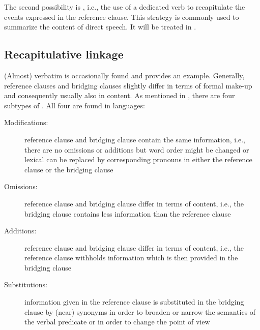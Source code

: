 \documentclass[output=paper]{LSP/langsci}
\begin{document}
The second possibility is , i.e., the use of a dedicated verb to recapitulate the events expressed in the reference clause. This strategy is commonly used to summarize the content of direct speech. It will be treated in .



\subsection{Recapitulative linkage}
\label{ssec:Recapitulative linkage}
(Almost) verbatim  is occasionally found and  provides an example. Generally, reference clauses and bridging clauses slightly differ in terms of formal make-up and consequently usually also in content. As mentioned in , there are four subtypes of . All four are found in  languages:

\begin{description}  
\item[Modifications:] reference clause and bridging clause contain the same information, i.e., there are no omissions or additions but word order might be changed or lexical  can be replaced by corresponding pronouns in either the reference clause or the bridging clause
\item[Omissions:] reference clause and bridging clause differ in terms of content, i.e., the bridging clause contains less information than the reference clause
\item[Additions:] reference clause and bridging clause differ in terms of content, i.e., the reference clause withholds information which is then provided in the bridging clause
\item[Substitutions:] information given in the reference clause is substituted in the bridging clause by (near) synonyms in order to broaden or narrow the semantics of the verbal predicate or in order to change the point of view  
\end{description}
\end{document}
